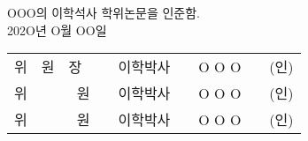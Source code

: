 \thispagestyle{empty}

\begin{center}
{\fontsize{22pt}{22}\selectfont
OOO의 이학석사 학위논문을 인준함.}\\[1.5cm]

{\fontsize{12pt}{12}\selectfont
202O년 O월 OO일}\\[9cm]

{\fontsize{16pt}{16}\selectfont
\begin{tabular}{lllllll}
        \fontsize{16pt}{16}\selectfont 위~~원~~장 &  & \fontsize{16pt}{16}\selectfont 이학박사 &  & \fontsize{16pt}{16}\selectfont O O O &  & \fontsize{16pt}{16}\selectfont (인) \\[1em]
        \fontsize{16pt}{16}\selectfont 위~~~~~~~원  &  & \fontsize{16pt}{16}\selectfont 이학박사 &  & \fontsize{16pt}{16}\selectfont O O O &  & \fontsize{16pt}{16}\selectfont (인) \\[1em]
        \fontsize{16pt}{16}\selectfont 위~~~~~~~원  &  & \fontsize{16pt}{16}\selectfont 이학박사 &  & \fontsize{16pt}{16}\selectfont O O O &  & \fontsize{16pt}{16}\selectfont (인)
\end{tabular}
}
\end{center}

\newpage
